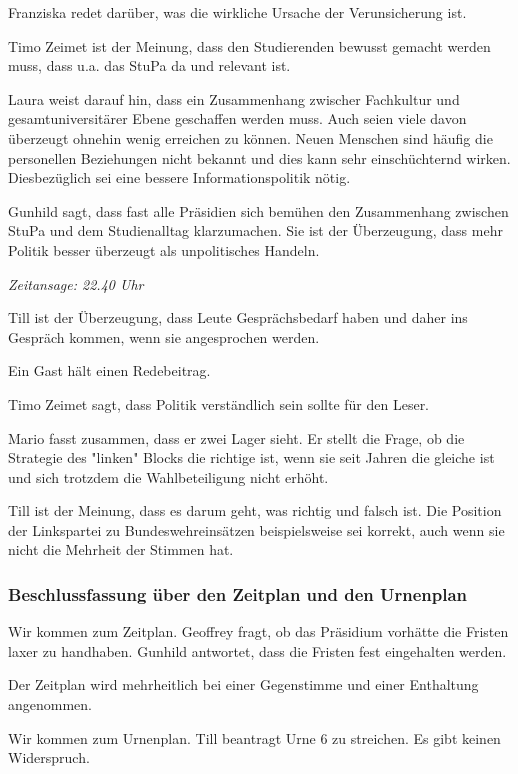 \documentclass[ngerman,headheight=70pt]{scrartcl}
\begin{document}
    Franziska redet darüber, was die wirkliche Ursache der Verunsicherung ist.

    Timo Zeimet ist der Meinung, dass den Studierenden bewusst gemacht werden muss,
    dass u.a. das StuPa da und relevant ist.

    Laura weist darauf hin, dass ein Zusammenhang zwischer Fachkultur und
    gesamtuniversitärer Ebene geschaffen werden muss. Auch seien viele davon überzeugt
    ohnehin wenig erreichen zu können. Neuen Menschen sind häufig die personellen
    Beziehungen nicht bekannt und dies kann sehr einschüchternd wirken.
    Diesbezüglich sei eine bessere Informationspolitik nötig.

    Gunhild sagt, dass fast alle Präsidien sich bemühen den Zusammenhang zwischen
    StuPa und dem Studienalltag klarzumachen. Sie ist der Überzeugung, dass
    mehr Politik besser überzeugt als unpolitisches Handeln.

    \textit{Zeitansage: 22.40 Uhr}

    Till ist der Überzeugung, dass Leute Gesprächsbedarf haben und daher ins
    Gespräch kommen, wenn sie angesprochen werden.

    Ein Gast hält einen Redebeitrag.

    Timo Zeimet sagt, dass Politik verständlich sein sollte für den Leser.

    Mario fasst zusammen, dass er zwei Lager sieht. Er stellt die Frage, ob
    die Strategie des "linken" Blocks die richtige ist, wenn sie seit Jahren die
    gleiche ist und sich trotzdem die Wahlbeteiligung nicht erhöht.

    Till ist der Meinung, dass es darum geht, was richtig und falsch ist. Die Position
    der Linkspartei zu Bundeswehreinsätzen beispielsweise sei korrekt, auch wenn
    sie nicht die Mehrheit der Stimmen hat.

    \subsubsection{Beschlussfassung über den Zeitplan und den Urnenplan}

    Wir kommen zum Zeitplan. Geoffrey fragt, ob das Präsidium vorhätte die Fristen
    laxer zu handhaben. Gunhild antwortet, dass die Fristen fest eingehalten werden.

    Der Zeitplan wird mehrheitlich bei einer Gegenstimme und einer Enthaltung
    angenommen.

    Wir kommen zum Urnenplan. Till beantragt Urne 6 zu streichen. Es gibt keinen
    Widerspruch.
\end{document}
